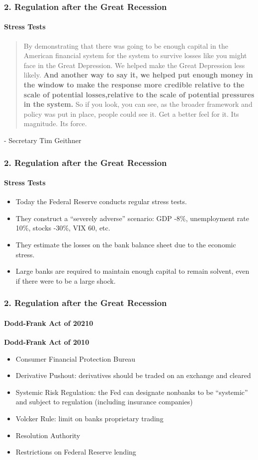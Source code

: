 \documentclass{beamer}
\begin{document}
\begin{frame}[t]
\frametitle{2. Regulation after the Great Recession}
\framesubtitle{Stress Tests}

    \begin{quote}
    By demonstrating that there was going to be enough capital in the American financial system for the system to survive losses like you might face in the Great Depression. We helped make the Great Depression less likely.  \textbf{And another way to say it, we helped put enough money in the window to make the response more credible relative to the scale of potential losses,relative to the scale of potential pressures in the system.} So if you look, you can see, as the broader framework and policy was put in place, people could see it. Get a better feel for it. Its magnitude. Its force. 
    \end{quote}
    - Secretary Tim Geithner

\end{frame}

\begin{frame}[t]
\frametitle{2. Regulation after the Great Recession}
\framesubtitle{Stress Tests}

    \begin{itemize}
        \item Today the Federal Reserve conducts regular stress tests.
        \item They construct a “severely adverse” scenario: GDP -8\%, unemployment rate 10\%, stocks -30\%, VIX 60, etc.
        \item They estimate the losses on the bank balance sheet due to the economic stress.
        \item Large banks are required to maintain enough capital to remain solvent, even if there were to be a large shock.
    \end{itemize}

\end{frame}

\begin{frame}[t]
\frametitle{2. Regulation after the Great Recession}
\framesubtitle{Dodd-Frank Act of 20210}

    \textbf{Dodd-Frank Act of 2010}
    \begin{itemize}
        \item Consumer Financial Protection Bureau
        \item Derivative Pushout: derivatives should be traded on an exchange and cleared
        \item Systemic Risk Regulation: the Fed can designate nonbanks to be “systemic” and subject to regulation (including insurance companies)
        \item Volcker Rule: limit on banks proprietary trading
        \item Resolution Authority
        \item Restrictions on Federal Reserve lending
    \end{itemize}

\end{frame}
\end{document}
